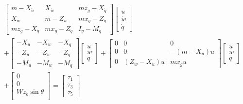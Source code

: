 		\begin{equation}
			\begin{aligned}
				\left [ \begin{array}{ccc}
					m - X_{\dot{u}} &  X_{\dot{w}} & m z_g - X_{\dot{q}} \\
					X_{\dot{w}} & m - Z_{\dot{w}} & m x_g - Z_{\dot{q}} \\
					m z_g - X_{\dot{q}} & m x_g - Z_{\dot{q}} & I_y - M_{\dot{q}} 
					\end{array} \right]
				\left [ \begin{array}{c}
					\dot{u} \\
					\dot{w} \\
					\dot{q} 
					\end{array} \right] \\
				+ \left [ \begin{array}{ccc}
					-X_u	&	-X_w 	&	-X_q \\
					-Z_u	&	-Z_w	&	-Z_q \\
					-M_u	&	-M_w	&	-M_q
					\end{array} \right]
				\left [ \begin{array}{c}
					u \\
					w \\
					q 
				\end{array} \right] + 
				\left [ \begin{array}{ccc} 
					0 & 0 & 0 \\
					0 & 0 &  -(m - X_{\dot{u}}) u \\
					0 & (Z_{\dot{w}} - X_{\dot{u}}) u & m x_g u 
					\end{array} \right]	
				\left [ \begin{array}{c}
					u \\
					w \\
					q 
				\end{array} \right] \\
				+  \left [ \begin{array}{c}
					0 \\
					0 \\
					W z_b \sin \theta \\
					\end{array} \right] = \left [ \begin{array}{c}
									\tau_1 \\
									\tau_3 \\
									\tau_5
								      \end{array} \right ]
			\end{aligned}
		\end{equation}
